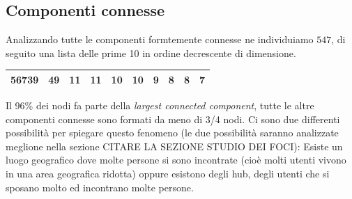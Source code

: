 \documentclass[a4paper]{article}
\newcommand{\lcc}{\textit{largest connected component}}
\begin{document}
\subsection{Componenti connesse}
Analizzando tutte le componenti formtemente connesse ne individuiamo $547$, di seguito una lista delle prime 10 in ordine decrescente di dimensione.
\begin{center}\begin{tabular}{ | c | c | c | c | c | c | c | c | c | c | }
  \hline
  56739 & 49 & 11 & 11 & 10 & 10 & 9 & 8 & 8 & 7\\
  \hline
\end{tabular}\end{center}
Il 96\% dei nodi fa parte della \lcc, tutte le altre componenti connesse sono formati da meno di 3/4 nodi. 
Ci sono due differenti possibilità per spiegare questo fenomeno (le due possibilità saranno analizzate meglione nella sezione CITARE LA SEZIONE STUDIO DEI FOCI): Esiste un luogo geografico dove molte persone si sono incontrate (cioè molti utenti vivono in una area geografica ridotta) oppure esistono degli hub, degli utenti che si sposano molto ed incontrano molte persone.
\end{document}

